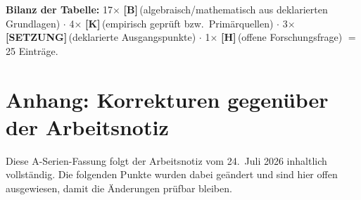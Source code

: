 \documentclass[11pt,a4paper]{article}
\newcommand{\LS}{\textcolor{laySet}{\textbf{\footnotesize\textsf{[SETZUNG]}}}\,}
\newcommand{\LK}{\textcolor{layK}{\textbf{\footnotesize\textsf{[K]}}}\,}
\newcommand{\LB}{\textcolor{layB}{\textbf{\footnotesize\textsf{[B]}}}\,}
\newcommand{\LH}{\textcolor{layH}{\textbf{\footnotesize\textsf{[H]}}}\,}
\begin{document}
\textbf{Bilanz der Tabelle:} 17$\times$ \LB (algebraisch/mathematisch aus
deklarierten Grundlagen) $\cdot$ 4$\times$ \LK (empirisch geprüft bzw.\
Primärquellen) $\cdot$ 3$\times$ \LS (deklarierte Ausgangspunkte) $\cdot$
1$\times$ \LH (offene Forschungsfrage) $=$ 25 Einträge.

\clearpage
{}
{}
\section*{Anhang: Korrekturen gegenüber der Arbeitsnotiz}
\label{sec:korr}

Diese A-Serien-Fassung folgt der Arbeitsnotiz vom 24.~Juli 2026 inhaltlich
vollständig. Die folgenden Punkte wurden dabei geändert und sind hier offen
ausgewiesen, damit die Änderungen prüfbar bleiben.
\end{document}
